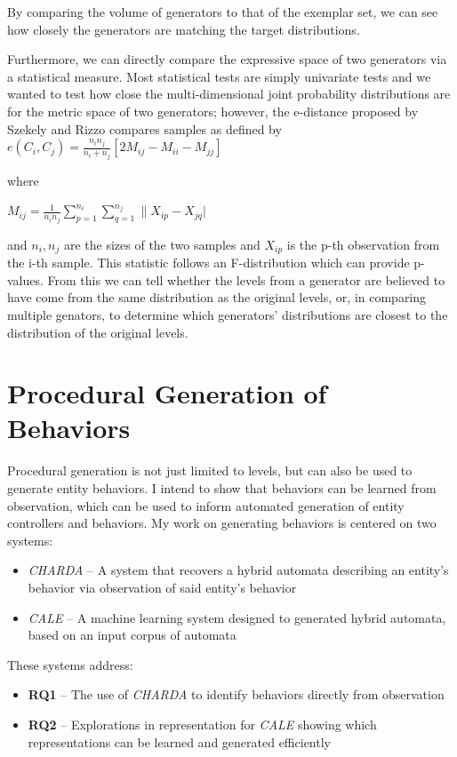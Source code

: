 \documentclass[12pt]{report}
\begin{document}
By comparing the volume of generators to that of the exemplar set, we can see how closely the generators are matching the target distributions.

Furthermore, we can directly compare the expressive space of two generators via a statistical measure.  Most statistical tests are simply univariate tests and we wanted to test how close the multi-dimensional joint probability distributions are for the metric space of two generators; however, the e-distance proposed by Szekely and Rizzo \cite{szekely2013energy} compares samples as defined by
$e(C_i,C_j) = \frac{n_in_j}{n_i+n_j}[2M_{ij}-M_{ii}-M_{jj}]$

where

$M_{ij} = \frac{1}{n_in_j}\sum_{p=1}^{n_i}\sum_{q=1}^{n_j}\|X_{ip}-X_{jq}|$

and $n_i,n_j$ are the sizes of the two samples and $X_{ip}$ is the p-th observation from the i-th sample.   This statistic follows an F-distribution which can provide p-values.  From this we can tell whether the levels from a generator are believed to have come from the same distribution as the original levels, or, in comparing multiple genators, to determine which generators' distributions are closest to the distribution of the original levels.  








\chapter*{Procedural Generation of Behaviors}

Procedural generation is not just limited to levels, but can also be used to generate entity behaviors.  I intend to show that behaviors can be learned from observation, which can be used to inform automated generation of entity controllers and behaviors. My work on generating behaviors is centered on two systems: 
\begin{itemize}
\item \textit{CHARDA} -- A system that recovers a hybrid automata describing an entity's behavior via observation of said entity's behavior
\item \textit{CALE} -- A machine learning system designed to generated hybrid automata, based on an input corpus of automata
\end{itemize}

These systems address:

\begin{itemize}
\item \textbf{RQ1} -- The use of \textit{CHARDA} to identify behaviors directly from observation
\item \textbf{RQ2} -- Explorations in representation for \textit{CALE} showing which representations can be learned and generated efficiently
\end{itemize}
\end{document}
